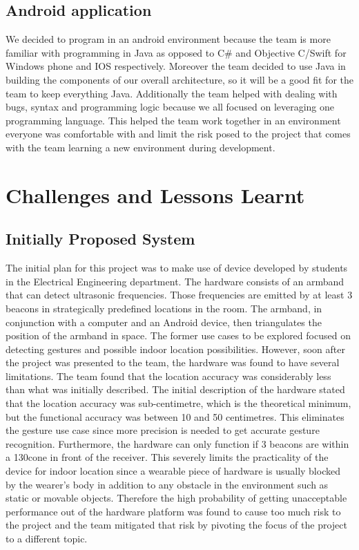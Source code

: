 \documentclass[prodmode,acmtosem]{acmsmall} %
\begin{document}
\subsection{Android application}
We decided to program in an android environment because the team is more familiar with programming in Java as opposed to C\# and Objective C/Swift for Windows phone and IOS respectively. Moreover the team decided to use Java in building the components of our overall architecture, so it will be a good fit for the team to keep everything Java. Additionally the team helped with dealing with bugs, syntax and programming logic because we all focused on leveraging one programming language. This helped the team work together in an environment everyone was comfortable with and limit the risk posed to the project that comes with the team learning a new environment during development.

\section{Challenges and Lessons Learnt}
\subsection{Initially Proposed System}
\label{sec:Prelim}
The initial plan for this project was to make use of device developed by students in the Electrical Engineering department. The hardware consists of an armband that can detect ultrasonic frequencies. Those frequencies are emitted by at least 3 beacons in strategically predefined locations in the room. The armband, in conjunction with a computer and an Android device, then triangulates the position of the armband in space.
The former use cases to be explored focused on detecting gestures and possible indoor location possibilities. However, soon after the project was presented to the team, the hardware was found to have several limitations. The team found that the location accuracy was considerably less than what was initially described. The initial description of the hardware stated that the location accuracy was sub-centimetre, which is the theoretical minimum, but the functional accuracy was between 10 and 50 centimetres. This eliminates the gesture use case since more precision is needed to get accurate gesture recognition.
Furthermore, the hardware can only function if 3 beacons are within a 130\degree cone in front of the receiver. This severely limits the practicality of the device for indoor location since a wearable piece of hardware is usually blocked by the wearer's body in addition to any obstacle in the environment such as static or movable objects.
Therefore the high probability of getting unacceptable performance out of the hardware platform was found to cause too much risk to the project and the team mitigated that risk by pivoting the focus of the project to a different topic.
\end{document}
